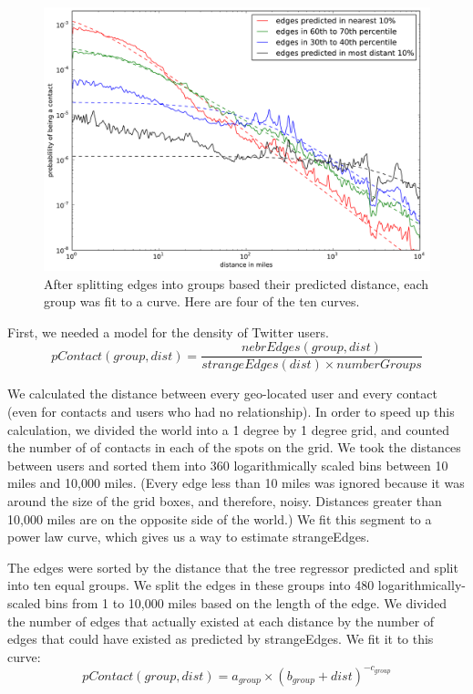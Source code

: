 \begin{figure}[tb]
\centering
\includegraphics[width=\linewidth]{figures/near_prob_fit.pdf}
\caption{
After splitting edges into groups based their predicted distance, each group was fit to a curve. Here are four of the ten curves.
}
\label{fig:NearProbFit}
\end{figure}

First, we needed a model for the density of Twitter users.
\[
    pContact(group,dist) = \frac{nebrEdges(group,dist)}{strangeEdges(dist) \times numberGroups}
\]

We calculated the distance between every geo-located user and every contact
(even for contacts and users who had no relationship).
%
In order to speed up this calculation, we divided the world into a \.1 degree
by \.1 degree grid, and counted the number of of contacts in each of the spots
on the grid.
%
We took the distances between users and sorted them into 360 logarithmically
scaled bins between 10 miles and 10,000 miles.
%
(Every edge less than 10 miles was ignored because it was around the size of
the grid boxes, and therefore, noisy. Distances greater than 10,000 miles are
on the opposite side of the world.)
%
We fit this segment to a power law curve, which gives us a way to estimate
strangeEdges.

The edges were sorted by the distance that the tree regressor predicted and
split into ten equal groups.
%
We split the edges in these groups into 480 logarithmically-scaled bins from 1
to 10,000 miles based on the length of the edge.
%
We divided the number of edges that actually existed at each distance by the
number of edges that could have existed as predicted by strangeEdges.
%
We fit it to this curve:
%
\[
pContact(group, dist) = a_{group} \times (b_{group}+dist)^{-c_{group}}
\]

